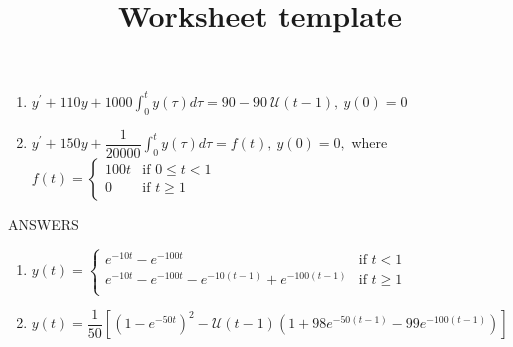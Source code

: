 \documentclass[12pt]{article}
\title{Worksheet template}
\begin{document}
\bigskip
\bigskip

\begin{enumerate}

\item
$\displaystyle y^{\prime} + 110y + 1000 \int_0^t y(\tau) d\tau  = 90 - 90 \> \mathcal{U}(t-1), \> y(0) = 0$ 

\item
$\displaystyle y^{\prime} + 150y + \dfrac{1}{20000} \int_0^t y(\tau) d\tau  = f(t), \> y(0) = 0,$ where
$f(t) =
\begin{cases}
100t & \mbox{if } 0 \le t < 1 \\ 
0 & \mbox{if } t \ge 1
\end{cases}$


\end{enumerate}

\bigskip

\newpage

ANSWERS

\begin{enumerate}
	\item $y(t) = \begin{cases}
		e^{-10t} - e^{-100t} & \mbox{if } t<1 \\
        e^{-10t} - e^{-100t} - e^{-10(t-1)} + e^{-100(t-1)} & \mbox{if } t \ge 1 \\
	\end{cases}$
	

	\item $y(t) = \dfrac{1}{50} \left[ \left( 1 - e^{-50t} \right)^2 - \mathcal{U}(t-1) 
    	\left( 1 + 98e^{-50(t-1)} - 99 e^{-100(t-1)}
        \right) \right]$

\end{enumerate}
\end{document}
